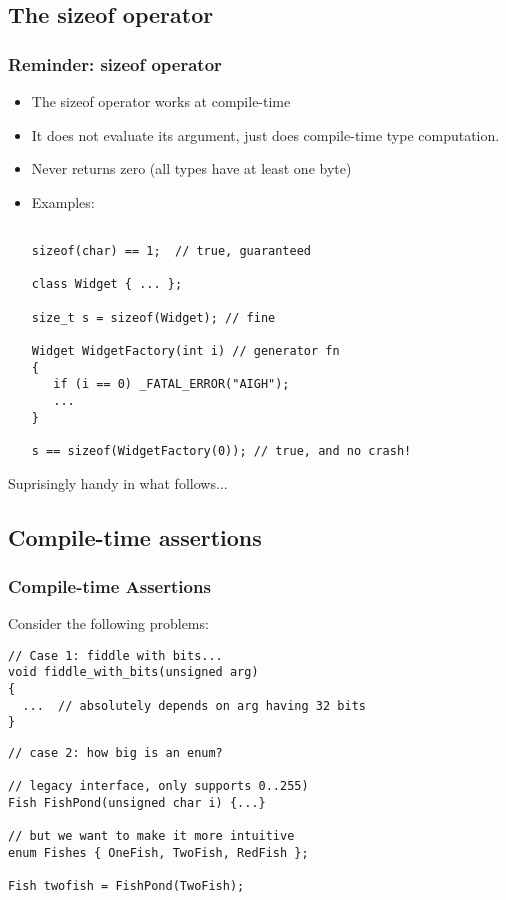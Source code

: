 \subsection{The sizeof operator}

\begin{frame}[fragile,t]
\frametitle{Reminder: sizeof operator}

\begin{itemize}[<+->]
\item The sizeof operator works at compile-time
\item It does not evaluate its argument, just does compile-time type
  computation.
\item Never returns zero (all types have at least one byte)
\item Examples:
{\scriptsize\begin{verbatim}

sizeof(char) == 1;  // true, guaranteed

class Widget { ... };

size_t s = sizeof(Widget); // fine

Widget WidgetFactory(int i) // generator fn
{
   if (i == 0) _FATAL_ERROR("AIGH");
   ...
}

s == sizeof(WidgetFactory(0)); // true, and no crash!
\end{verbatim}
}
\end{itemize}
\pause
Suprisingly handy in what follows...
\end{frame}


\subsection{Compile-time assertions}

\begin{frame}[fragile,t]
\frametitle{Compile-time Assertions}
Consider the following problems:
{\scriptsize\begin{verbatim}
// Case 1: fiddle with bits...
void fiddle_with_bits(unsigned arg)
{
  ...  // absolutely depends on arg having 32 bits
}
\end{verbatim}
}
\pause
{\scriptsize\begin{verbatim}
// case 2: how big is an enum?

// legacy interface, only supports 0..255)
Fish FishPond(unsigned char i) {...} 

// but we want to make it more intuitive
enum Fishes { OneFish, TwoFish, RedFish };

Fish twofish = FishPond(TwoFish);
\end{verbatim}
}

\end{frame}

